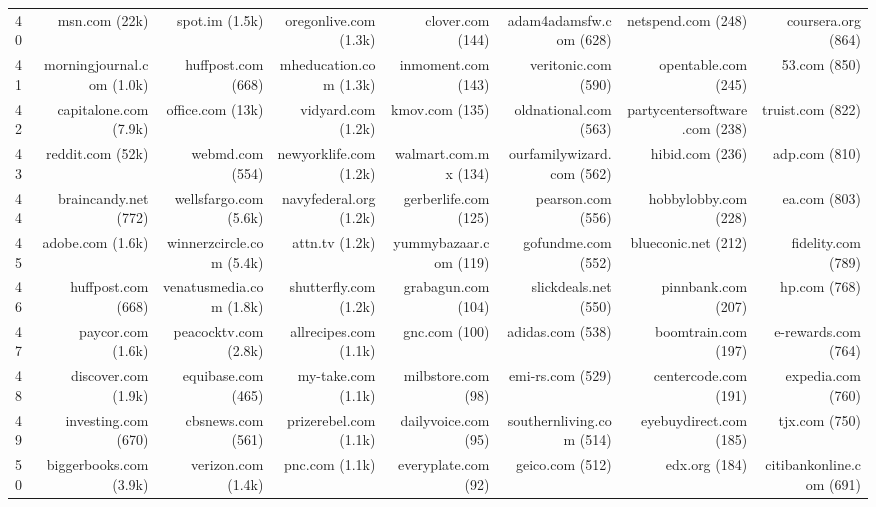 \begin{table}
{\begin{tabular}[t]{lrrrrrrr}
40 & msn.com (22k) & spot.im (1.5k) & oregonlive.com (1.3k) & clover.com (144) & adam4adamsfw.com (628) & netspend.com (248) & coursera.org (864)\\
41 & morningjournal.com (1.0k) & huffpost.com (668) & mheducation.com (1.3k) & inmoment.com (143) & veritonic.com (590) & opentable.com (245) & 53.com (850)\\
42 & capitalone.com (7.9k) & office.com (13k) & vidyard.com (1.2k) & kmov.com (135) & oldnational.com (563) & partycentersoftware.com (238) & truist.com (822)\\
43 & reddit.com (52k) & webmd.com (554) & newyorklife.com (1.2k) & walmart.com.mx (134) & ourfamilywizard.com (562) & hibid.com (236) & adp.com (810)\\
44 & braincandy.net (772) & wellsfargo.com (5.6k) & navyfederal.org (1.2k) & gerberlife.com (125) & pearson.com (556) & hobbylobby.com (228) & ea.com (803)\\
45 & adobe.com (1.6k) & winnerzcircle.com (5.4k) & attn.tv (1.2k) & yummybazaar.com (119) & gofundme.com (552) & blueconic.net (212) & fidelity.com (789)\\
46 & huffpost.com (668) & venatusmedia.com (1.8k) & shutterfly.com (1.2k) & grabagun.com (104) & slickdeals.net (550) & pinnbank.com (207) & hp.com (768)\\
47 & paycor.com (1.6k) & peacocktv.com (2.8k) & allrecipes.com (1.1k) & gnc.com (100) & adidas.com (538) & boomtrain.com (197) & e-rewards.com (764)\\
48 & discover.com (1.9k) & equibase.com (465) & my-take.com (1.1k) & milbstore.com (98) & emi-rs.com (529) & centercode.com (191) & expedia.com (760)\\
49 & investing.com (670) & cbsnews.com (561) & prizerebel.com (1.1k) & dailyvoice.com (95) & southernliving.com (514) & eyebuydirect.com (185) & tjx.com (750)\\
50 & biggerbooks.com (3.9k) & verizon.com (1.4k) & pnc.com (1.1k) & everyplate.com (92) & geico.com (512) & edx.org (184) & citibankonline.com (691)\\
\bottomrule
\end{tabular}}
\end{table}
